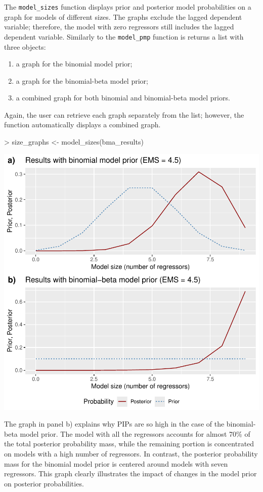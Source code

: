 \documentclass[a4paper]{article}
\begin{document}
The \verb+model_sizes+ function displays prior and posterior model probabilities on a graph for models of different sizes. The graphs exclude the lagged dependent variable; therefore, the model with zero regressors still includes the lagged dependent variable. Similarly to the \verb+model_pmp+ function is returns a list with three objects:
\begin{enumerate}
    \item a graph for the binomial model prior;
    \item a graph for the binomial-beta model prior;
    \item a combined graph for both binomial and binomial-beta model priors.
\end{enumerate}
Again, the user can retrieve each graph separately from the list; however, the function automatically displays a combined graph.
\begin{Schunk}
\begin{Sinput}
> size_graphs <- model_sizes(bma_results)
\end{Sinput}
\end{Schunk}
\includegraphics{bdsm_vignette-016}

The graph in panel b) explains why PIPs are so high in the case of the binomial-beta model prior. The model with all the regressors accounts for almost 70\% of the total posterior probability mass, while the remaining portion is concentrated on models with a high number of regressors. In contrast, the posterior probability mass for the binomial model prior is centered around models with seven regressors. This graph clearly illustrates the impact of changes in the model prior on posterior probabilities.
\end{document}

